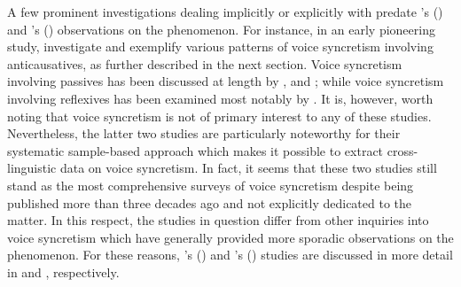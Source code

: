 A few prominent investigations dealing implicitly or explicitly with  predate \citeauthor{klaiman:1991}’s (\citeyear{klaiman:1991}) and \citeauthor{kemmer:1993}’s (\citeyear{kemmer:1993}) observations on the phenomenon. For instance, in an early pioneering study, \citet[40ff.]{nedjalkov:silnickij:1969} investigate and exemplify various patterns of voice syncretism involving anticausatives, as further described in the next section. Voice syncretism involving passives has been discussed at length by \citet{siewierska:1984}, \citet{shibatani:1985} and \citet{haspelmath:1990}; while voice syncretism involving reflexives has been examined most notably by \citet{geniusiene:1987}. It is, however, worth noting that voice syncretism is not of primary interest to any of these studies. Nevertheless, the latter two studies are particularly noteworthy for their systematic sample-based approach which makes it possible to extract cross-linguistic data on voice syncretism. In fact, it seems that these two studies still stand as the most comprehensive surveys of voice syncretism despite being published more than three decades ago and not explicitly dedicated to the matter. In this respect, the studies in question differ from other inquiries into voice syncretism which have generally provided more sporadic observations on the phenomenon. For these reasons, \citeauthor{geniusiene:1987}’s (\citeyear{geniusiene:1987}) and \citeauthor{haspelmath:1990}’s (\citeyear{haspelmath:1990}) studies are discussed in more detail in  and , respectively.


